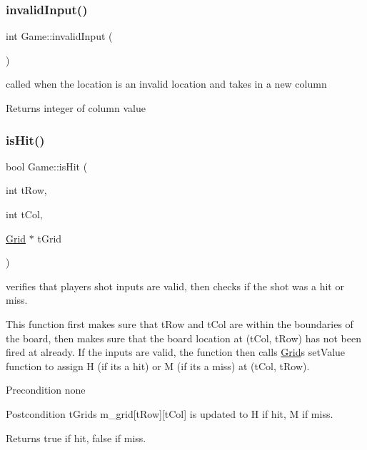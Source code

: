 \subsubsection{\texorpdfstring{invalid\+Input()}{invalidInput()}}
{\footnotesize\ttfamily int Game\+::invalid\+Input (\begin{DoxyParamCaption}{ }\end{DoxyParamCaption})}



called when the location is an invalid location and takes in a new column 

\begin{DoxyReturn}{Returns}
integer of column value 
\end{DoxyReturn}
\mbox{\label{classGame_a44dd26e02329730028443a7ff28e1513}} 
\subsubsection{\texorpdfstring{is\+Hit()}{isHit()}}
{\footnotesize\ttfamily bool Game\+::is\+Hit (\begin{DoxyParamCaption}\item[{int}]{t\+Row,  }\item[{int}]{t\+Col,  }\item[{\hyperlink{classGrid}{Grid} $\ast$}]{t\+Grid }\end{DoxyParamCaption})}



verifies that player\textquotesingle{}s shot inputs are valid, then checks if the shot was a hit or miss. 

This function first makes sure that t\+Row and t\+Col are within the boundaries of the board, then makes sure that the board location at (t\+Col, t\+Row) has not been fired at already. If the inputs are valid, the function then calls \hyperlink{classGrid}{Grid}\textquotesingle{}s set\+Value function to assign H (if it\textquotesingle{}s a hit) or M (if it\textquotesingle{}s a miss) at (t\+Col, t\+Row).

\begin{DoxyPrecond}{Precondition}
none 
\end{DoxyPrecond}
\begin{DoxyPostcond}{Postcondition}
t\+Grid\textquotesingle{}s m\+\_\+grid\mbox{[}t\+Row\mbox{]}\mbox{[}t\+Col\mbox{]} is updated to H if hit, M if miss. 
\end{DoxyPostcond}
\begin{DoxyReturn}{Returns}
true if hit, false if miss. 
\end{DoxyReturn}


